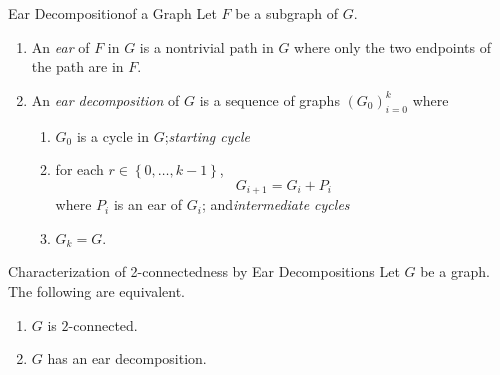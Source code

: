 \documentclass[co342]{subfiles}
\begin{document}
    \begin{definition}{Ear Decomposition}{of a Graph}
        Let $F$ be a subgraph of $G$.
        \begin{enumerate}
            \item An \emph{ear} of $F$ in $G$ is a nontrivial path in $G$ where only the two endpoints of the path are in $F$.
            \item An \emph{ear decomposition} of $G$ is a sequence of graphs $\left( G_{0} \right)^{k}_{i=0}$ where
                \begin{enumerate}
                    \item $G_0$ is a cycle in $G$;\hfill\textit{starting cycle}
                    \item for each $r\in\left\lbrace 0,\ldots,k-1 \right\rbrace$,
                        \begin{equation*}
                            G_{i+1} = G_i+P_i
                        \end{equation*}
                        where $P_i$ is an ear of $G_i$; and\hfill\textit{intermediate cycles}
                    \item $G_k=G$.
                \end{enumerate}
        \end{enumerate}
    \end{definition}

    \begin{prop}{Characterization of 2-connectedness by Ear Decompositions}
        Let $G$ be a graph. The following are equivalent.
        \begin{enumerate}
            \item $G$ is $2$-connected.
            \item $G$ has an ear decomposition.
        \end{enumerate}
    \end{prop}
\end{document}
